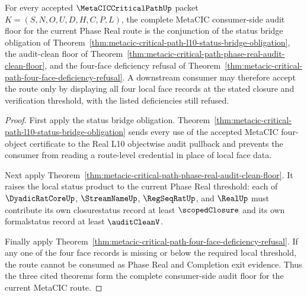 \begin{theorem}
\label{thm:metacic-critical-path-four-face-audit-floor}
For every accepted $\MetaCICCriticalPathUp$ packet $K=(S,N,O,U,D,H,C,P,L)$, the complete MetaCIC consumer-side audit floor for the current Phase Real route is the conjunction of the status bridge obligation of Theorem~\ref{thm:metacic-critical-path-l10-status-bridge-obligation}, the audit-clean floor of Theorem~\ref{thm:metacic-critical-path-phase-real-audit-clean-floor}, and the four-face deficiency refusal of Theorem~\ref{thm:metacic-critical-path-four-face-deficiency-refusal}. A downstream consumer may therefore accept the route only by displaying all four local face records at the stated closure and verification threshold, with the listed deficiencies still refused.
\end{theorem}
\begin{proof}
First apply the status bridge obligation. Theorem~\ref{thm:metacic-critical-path-l10-status-bridge-obligation} sends every use of the accepted MetaCIC four-object certificate to the Real L10 objectwise audit pullback and prevents the consumer from reading a route-level credential in place of local face data.

Next apply Theorem~\ref{thm:metacic-critical-path-phase-real-audit-clean-floor}. It raises the local status product to the current Phase Real threshold: each of $\DyadicRatCoreUp$, $\StreamNameUp$, $\RegSeqRatUp$, and $\RealUp$ must contribute its own closurestatus record at least $\scopedClosure$ and its own formalstatus record at least $\auditCleanV$.

Finally apply Theorem~\ref{thm:metacic-critical-path-four-face-deficiency-refusal}. If any one of the four face records is missing or below the required local threshold, the route cannot be consumed as Phase Real and Completion exit evidence. Thus the three cited theorems form the complete consumer-side audit floor for the current MetaCIC route.
\end{proof}

